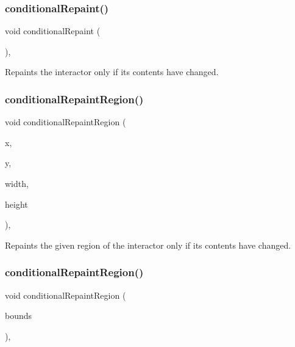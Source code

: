 \subsubsection{\texorpdfstring{conditional\+Repaint()}{conditionalRepaint()}}
{\footnotesize\ttfamily void conditional\+Repaint (\begin{DoxyParamCaption}{ }\end{DoxyParamCaption})\hspace{0.3cm}{\ttfamily [virtual]}, {\ttfamily [inherited]}}



Repaints the interactor only if its contents have changed. 

\mbox{\label{classsgl_1_1GDrawingSurface_aedd4b792311d946eeaf44b0de337a408}} 
\subsubsection{\texorpdfstring{conditional\+Repaint\+Region()}{conditionalRepaintRegion()}\hspace{0.1cm}{\footnotesize\ttfamily [1/2]}}
{\footnotesize\ttfamily void conditional\+Repaint\+Region (\begin{DoxyParamCaption}\item[{int}]{x,  }\item[{int}]{y,  }\item[{int}]{width,  }\item[{int}]{height }\end{DoxyParamCaption})\hspace{0.3cm}{\ttfamily [virtual]}, {\ttfamily [inherited]}}



Repaints the given region of the interactor only if its contents have changed. 

\mbox{\label{classsgl_1_1GDrawingSurface_a3932a12278752db368e24fa404e446aa}} 
\subsubsection{\texorpdfstring{conditional\+Repaint\+Region()}{conditionalRepaintRegion()}\hspace{0.1cm}{\footnotesize\ttfamily [2/2]}}
{\footnotesize\ttfamily void conditional\+Repaint\+Region (\begin{DoxyParamCaption}\item[{const \mbox{\hyperlink{structsgl_1_1GRectangle}{G\+Rectangle}} \&}]{bounds }\end{DoxyParamCaption})\hspace{0.3cm}{\ttfamily [virtual]}, {\ttfamily [inherited]}}



